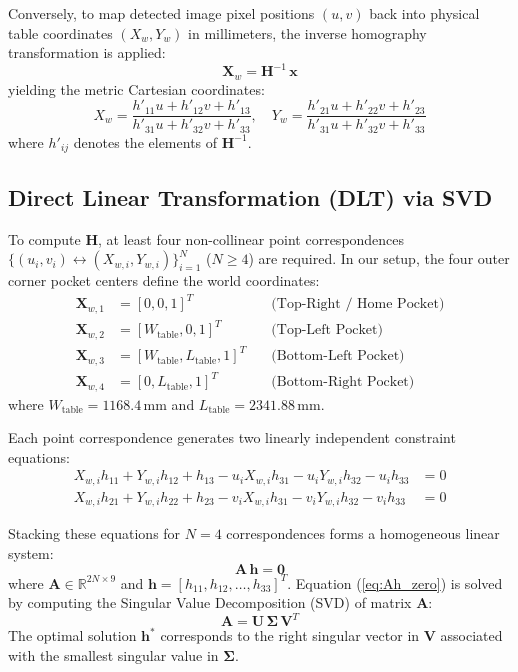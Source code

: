 Conversely, to map detected image pixel positions $(u, v)$ back into physical table coordinates $(X_w, Y_w)$ in millimeters, the inverse homography transformation is applied:
\begin{equation}
    \mathbf{X}_w = \mathbf{H}^{-1} \, \mathbf{x}
    \label{eq:inverse_homography}
\end{equation}
yielding the metric Cartesian coordinates:
\begin{equation}
    X_w = \frac{h'_{11} u + h'_{12} v + h'_{13}}{h'_{31} u + h'_{32} v + h'_{33}}, \quad
    Y_w = \frac{h'_{21} u + h'_{22} v + h'_{23}}{h'_{31} u + h'_{32} v + h'_{33}}
    \label{eq:metric_xy}
\end{equation}
where $h'_{ij}$ denotes the elements of $\mathbf{H}^{-1}$.

\subsection{Direct Linear Transformation (DLT) via SVD}
To compute $\mathbf{H}$, at least four non-collinear point correspondences $\{ (u_i, v_i) \leftrightarrow (X_{w,i}, Y_{w,i}) \}_{i=1}^N$ ($N \ge 4$) are required. In our setup, the four outer corner pocket centers define the world coordinates:
\begin{align}
    \mathbf{X}_{w,1} &= [0, 0, 1]^T \quad &\text{(Top-Right / Home Pocket)} \nonumber \\
    \mathbf{X}_{w,2} &= [W_{\text{table}}, 0, 1]^T \quad &\text{(Top-Left Pocket)} \nonumber \\
    \mathbf{X}_{w,3} &= [W_{\text{table}}, L_{\text{table}}, 1]^T \quad &\text{(Bottom-Left Pocket)} \nonumber \\
    \mathbf{X}_{w,4} &= [0, L_{\text{table}}, 1]^T \quad &\text{(Bottom-Right Pocket)}
\end{align}
where $W_{\text{table}} = 1168.4\,\text{mm}$ and $L_{\text{table}} = 2341.88\,\text{mm}$.

Each point correspondence generates two linearly independent constraint equations:
\begin{align}
    X_{w,i} h_{11} + Y_{w,i} h_{12} + h_{13} - u_i X_{w,i} h_{31} - u_i Y_{w,i} h_{32} - u_i h_{33} &= 0 \nonumber \\
    X_{w,i} h_{21} + Y_{w,i} h_{22} + h_{23} - v_i X_{w,i} h_{31} - v_i Y_{w,i} h_{32} - v_i h_{33} &= 0
\end{align}

Stacking these equations for $N=4$ correspondences forms a homogeneous linear system:
\begin{equation}
    \mathbf{A} \, \mathbf{h} = \mathbf{0}
    \label{eq:Ah_zero}
\end{equation}
where $\mathbf{A} \in \mathbb{R}^{2N \times 9}$ and $\mathbf{h} = [h_{11}, h_{12}, \dots, h_{33}]^T$. Equation (\ref{eq:Ah_zero}) is solved by computing the Singular Value Decomposition (SVD) of matrix $\mathbf{A}$:
\begin{equation}
    \mathbf{A} = \mathbf{U} \, \mathbf{\Sigma} \, \mathbf{V}^T
\end{equation}
The optimal solution $\mathbf{h}^*$ corresponds to the right singular vector in $\mathbf{V}$ associated with the smallest singular value in $\mathbf{\Sigma}$.

